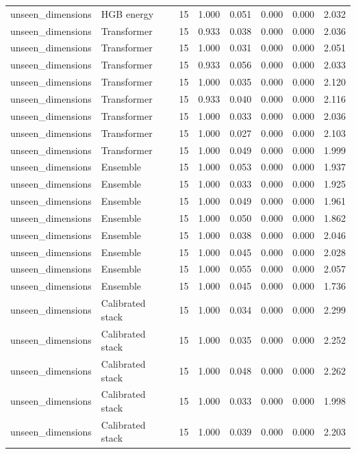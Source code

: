 {\begin{longtable}{llrrrrrr}
unseen\_dimensions & HGB energy & 15 & 1.000 & 0.051 & 0.000 & 0.000 & 2.032 \\
unseen\_dimensions & Transformer & 15 & 0.933 & 0.038 & 0.000 & 0.000 & 2.036 \\
unseen\_dimensions & Transformer & 15 & 1.000 & 0.031 & 0.000 & 0.000 & 2.051 \\
unseen\_dimensions & Transformer & 15 & 0.933 & 0.056 & 0.000 & 0.000 & 2.033 \\
unseen\_dimensions & Transformer & 15 & 1.000 & 0.035 & 0.000 & 0.000 & 2.120 \\
unseen\_dimensions & Transformer & 15 & 0.933 & 0.040 & 0.000 & 0.000 & 2.116 \\
unseen\_dimensions & Transformer & 15 & 1.000 & 0.033 & 0.000 & 0.000 & 2.036 \\
unseen\_dimensions & Transformer & 15 & 1.000 & 0.027 & 0.000 & 0.000 & 2.103 \\
unseen\_dimensions & Transformer & 15 & 1.000 & 0.049 & 0.000 & 0.000 & 1.999 \\
unseen\_dimensions & Ensemble & 15 & 1.000 & 0.053 & 0.000 & 0.000 & 1.937 \\
unseen\_dimensions & Ensemble & 15 & 1.000 & 0.033 & 0.000 & 0.000 & 1.925 \\
unseen\_dimensions & Ensemble & 15 & 1.000 & 0.049 & 0.000 & 0.000 & 1.961 \\
unseen\_dimensions & Ensemble & 15 & 1.000 & 0.050 & 0.000 & 0.000 & 1.862 \\
unseen\_dimensions & Ensemble & 15 & 1.000 & 0.038 & 0.000 & 0.000 & 2.046 \\
unseen\_dimensions & Ensemble & 15 & 1.000 & 0.045 & 0.000 & 0.000 & 2.028 \\
unseen\_dimensions & Ensemble & 15 & 1.000 & 0.055 & 0.000 & 0.000 & 2.057 \\
unseen\_dimensions & Ensemble & 15 & 1.000 & 0.045 & 0.000 & 0.000 & 1.736 \\
unseen\_dimensions & Calibrated stack & 15 & 1.000 & 0.034 & 0.000 & 0.000 & 2.299 \\
unseen\_dimensions & Calibrated stack & 15 & 1.000 & 0.035 & 0.000 & 0.000 & 2.252 \\
unseen\_dimensions & Calibrated stack & 15 & 1.000 & 0.048 & 0.000 & 0.000 & 2.262 \\
unseen\_dimensions & Calibrated stack & 15 & 1.000 & 0.033 & 0.000 & 0.000 & 1.998 \\
unseen\_dimensions & Calibrated stack & 15 & 1.000 & 0.039 & 0.000 & 0.000 & 2.203 \\

\end{longtable}}
